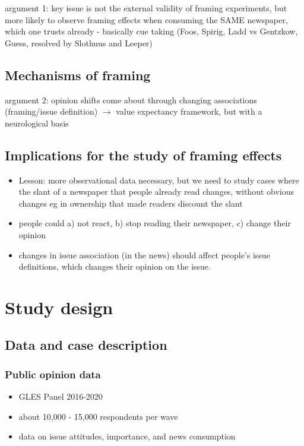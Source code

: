 \documentclass{article}
\begin{document}
argument 1: key issue is not the external validity of framing experiments, but more likely to observe framing effects when consuming the SAME newspaper, which one trusts already - basically cue taking (Foos, Spirig, Ladd vs Gentzkow, Guess, resolved by Slothuus and Leeper)


\subsection{Mechanisms of framing}

argument 2: opinion shifts come about through changing associations (framing/issue definition) $\rightarrow$ value expectancy framework, but with a neurological basis


\subsection{Implications for the study of framing effects}

\begin{itemize}
\item Lesson: more observational data necessary, but we need to study cases where the slant of a newspaper that people already read changes, without obvious changes eg in ownership that made readers discount the slant
\item people could a) not react, b) stop reading their newspaper, c) change their opinion
\item changes in issue association (in the news) should affect people's issue definitions, which changes their opinion on the issue.
\end{itemize}


\section{Study design}

\subsection{Data and case description}

\subsubsection{Public opinion data}


\begin{itemize}
    \item GLES Panel 2016-2020
    \item about 10,000 - 15,000 respondents per wave
    \item data on issue attitudes, importance, and news consumption
\end{itemize}
\end{document}
